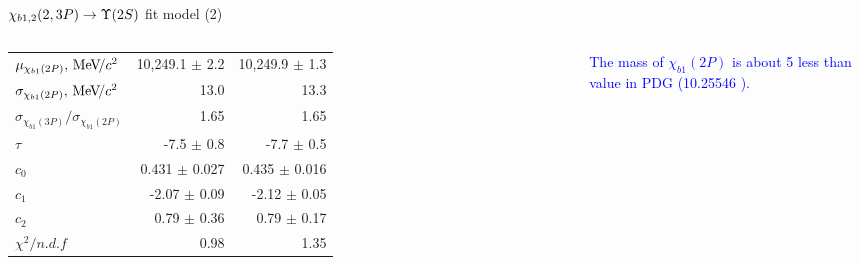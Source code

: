 \begin{frame}{$\chi_{b1,2}(2,3P) \to \TwoS$ fit model (2)}
\begin{columns}[T]
{\begin{tabular}{lrr}
\rule{0pt}{4ex}$\mu_{\chi_{b 1}(2P)}, {\mathrm{\,Me\kern -0.1em V\!/}c^2}$ & 10,249.1 $\pm$ 2.2 & 10,249.9 $\pm$ 1.3\\
$\sigma_{\chi_{b 1}(2P)}, {\mathrm{\,Me\kern -0.1em V\!/}c^2}$ & 13.0 & 13.3\\
$\sigma_{\chi_{b1}(3P)} / \sigma_{\chi_{b1}(2P)}$ & 1.65 & 1.65\\

\rule{0pt}{4ex}$\tau$ & -7.5 $\pm$ 0.8 & -7.7 $\pm$ 0.5\\
$c_0$ & 0.431 $\pm$ 0.027 & 0.435 $\pm$ 0.016\\
$c_1$ & -2.07 $\pm$ 0.09 & -2.12 $\pm$ 0.05\\
$c_2$ & 0.79 $\pm$ 0.36 & 0.79 $\pm$ 0.17\\

\rule{0pt}{4ex}$\chi^2 / n.d.f$ & 0.98 & 1.35\\
\bottomrule
\end{tabular}
} %

\bigskip
{\tiny \textcolor{blue}{The mass of $\chi_{b1}(2P)$  is about 5 \mevcc  less than value in PDG (10.25546 \mevcc).}}
\end{columns}


\end{frame}
